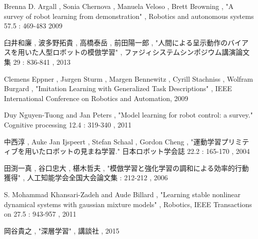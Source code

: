 \begin{thebibliography}{99}
Brenna D. Argall , Sonia Chernova , Manuela Veloso , Brett Browning , "A survey of robot learning from demonstration" , Robotics and autonomous systems 57.5 : 469-483 2009

臼井和廉 , 波多野拓貴 , 高橋泰岳 , 前田陽一郎 , "人間による呈示動作のバイアスを用いた人型ロボットの模倣学習" , ファジィシステムシンポジウム講演論文集 29 : 836-841 , 2013

Clemens Eppner , J$\ddot{u}$rgen Sturm , Margen Bennewitz , Cyrill Stachniss , Wolfram Burgard , "Imitation Learning with Generalized Task Descriptions" , IEEE International Conference on Robotics and Automation, 2009

Duy Nguyen-Tuong  and Jan Peters , "Model learning for robot control: a survey." Cognitive processing 12.4 : 319-340 , 2011

中西淳 , Auke Jan Ijspeert , Stefan Schaal , Gordon Cheng , "運動学習プリミティブを用いたロボットの見まね学習." 日本ロボット学会誌 22.2 : 165-170 , 2004

田渕一真 , 谷口忠大 , 椹木哲夫 , "模倣学習と強化学習の調和による効率的行動獲得" , 人工知能学会全国大会論文集 : 212-212 , 2006

S. Mohammad Khansari-Zadeh and Aude Billard , "Learning stable nonlinear dynamical systems with gaussian mixture models" , Robotics, IEEE Transactions on 27.5 : 943-957 , 2011

岡谷貴之 , "深層学習" , 講談社 , 2015

\end{thebibliography}


